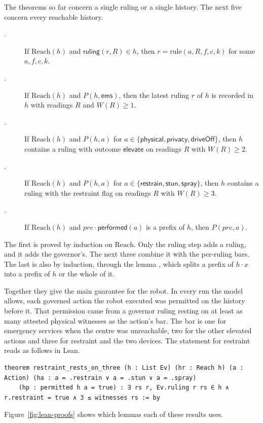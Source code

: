 The theorems so far concern a single ruling or a single history.
The next five concern every reachable history.
\begin{description}
  \item[.] If $\mathrm{Reach}(h)$ and
  $\mathsf{ruling}(r, R) \in h$, then $r = \mathrm{rule}(a, R, f, c, k)$ for some
  $a, f, c, k$.
  \item[.] If $\mathrm{Reach}(h)$ and $P(h, \mathsf{ems})$, then
  the latest ruling $r$ of $h$ is recorded in $h$ with readings $R$ and $W(R) \ge 1$.
  \item[.] If $\mathrm{Reach}(h)$ and $P(h, a)$ for
  $a \in \{\mathsf{physical}, \mathsf{privacy}, \mathsf{driveOff}\}$, then $h$ contains a ruling
  with outcome $\mathsf{elevate}$ on readings $R$ with $W(R) \ge 2$.
  \item[.] If $\mathrm{Reach}(h)$ and $P(h, a)$ for
  $a \in \{\mathsf{restrain}, \mathsf{stun}, \mathsf{spray}\}$, then $h$ contains a ruling with the
  restraint flag on readings $R$ with $W(R) \ge 3$.
  \item[.] If $\mathrm{Reach}(h)$ and
  $\mathit{pre} \cdot \mathsf{performed}(a)$ is a prefix of $h$, then $P(\mathit{pre}, a)$.
\end{description}
The first is proved by induction on $\mathrm{Reach}$.
Only the ruling step adds a ruling, and it adds the governor's.
The next three combine it with the per-ruling bars.
The last is also by induction, through the lemma , which splits a prefix of
$h \cdot x$ into a prefix of $h$ or the whole of it.

Together they give the main guarantee for the robot.
In every run the model allows, each governed action the robot executed was permitted on the
history before it.
That permission came from a governor ruling resting on at least as many attested physical
witnesses as the action's bar.
The bar is one for emergency services when the centre was unreachable, two for the other
elevated actions and three for restraint and the two devices.
The statement for restraint reads as follows in Lean.
\begin{lstlisting}[style=lean]
theorem restraint_rests_on_three (h : List Ev) (hr : Reach h) (a : Action) (ha : a = .restrain ∨ a = .stun ∨ a = .spray)
    (hp : permitted h a = true) : ∃ rs r, Ev.ruling r rs ∈ h ∧ r.restraint = true ∧ 3 ≤ witnesses rs := by
\end{lstlisting}
Figure~\ref{fig:lean-proofs} shows which lemmas each of these results uses.

